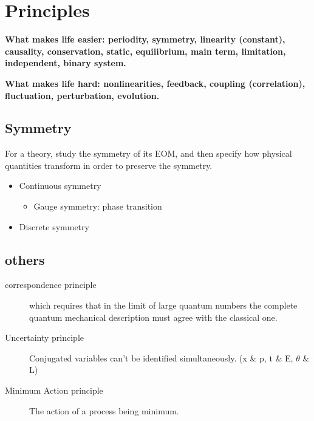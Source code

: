 \section{Principles}
\textbf{What makes life easier: periodity, symmetry, linearity (constant), causality, conservation, static, equilibrium, main term, limitation, independent, binary system.}

\textbf{What makes life hard: nonlinearities, feedback, coupling (correlation), fluctuation, perturbation, evolution.}

\subsection{Symmetry}
For a theory, study the symmetry of its EOM, and then specify how physical quantities transform in order to preserve the symmetry.
\begin{itemize}
    \item Continuous symmetry
	\begin{itemize}
	    \item Gauge symmetry: phase transition
	\end{itemize}
    \item Discrete symmetry
\end{itemize}




\subsection{others}
\begin{description}
    \item[correspondence principle]
	which requires that in the limit of large quantum numbers the 
	complete quantum mechanical description must agree with the 
	classical one.
    \item[Uncertainty principle]
	Conjugated variables can't be identified simultaneously. (x \& p, t \& E, $\theta$ \& L)
    \item[Minimum Action principle]
	The action of a process being minimum.
\end{description}
